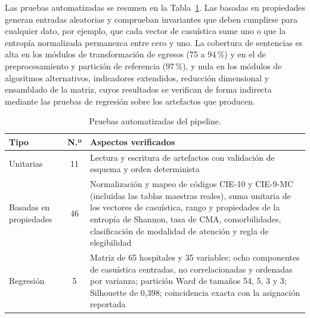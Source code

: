 Las pruebas automatizadas se resumen en la Tabla~\ref{tab:pruebas}. Las basadas
en propiedades generan entradas aleatorias y comprueban invariantes que deben
cumplirse para cualquier dato, por ejemplo, que cada vector de casuística sume
uno o que la entropía normalizada permanezca entre cero y uno. La cobertura de
sentencias es alta en los módulos de transformación de egresos (75 a 94\,\%) y
en el de preprocesamiento y partición de referencia (97\,\%), y nula en los
módulos de algoritmos alternativos, indicadores extendidos, reducción
dimensional y ensamblado de la matriz, cuyos resultados se verifican de forma
indirecta mediante las pruebas de regresión sobre los artefactos que producen.

\begin{table}[htbp]
\centering
\caption{Pruebas automatizadas del pipeline.}
\label{tab:pruebas}
\small
\begin{tabularx}{\textwidth}{>{\raggedright\arraybackslash}p{3.2cm} c >{\raggedright\arraybackslash}X}
\toprule
\textbf{Tipo} & \textbf{N.º} & \textbf{Aspectos verificados} \\
\midrule
Unitarias & 11 & Lectura y escritura de artefactos con validación de esquema y orden determinista \\
Basadas en propiedades & 46 & Normalización y mapeo de códigos CIE-10 y CIE-9-MC (incluidas las tablas maestras reales), suma unitaria de los vectores de casuística, rango y propiedades de la entropía de Shannon, tasa de CMA, comorbilidades, clasificación de modalidad de atención y regla de elegibilidad \\
Regresión & 5 & Matriz de 65 hospitales y 35 variables; ocho componentes de casuística centradas, no correlacionadas y ordenadas por varianza; partición Ward de tamaños 54, 5, 3 y 3; Silhouette de 0,398; coincidencia exacta con la asignación reportada \\
\bottomrule
\end{tabularx}
\end{table}

